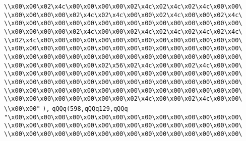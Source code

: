 \verb|\\x00\x00\x02\x4c\x00\x00\x00\x00\x02\x4c\x02\x4c\x02\x4c\x00\x00\|\newline
\verb|\\x00\x00\x00\x00\x02\x4c\x02\x4c\x00\x00\x02\x4c\x00\x00\x02\x4c\|\newline
\verb|\\x00\x00\x00\x00\x00\x00\x00\x00\x00\x00\x00\x00\x00\x00\x00\x00\|\newline
\verb|\\x00\x00\x00\x00\x02\x4c\x00\x00\x02\x4c\x02\x4c\x02\x4c\x02\x4c\|\newline
\verb|\\x02\x4c\x00\x00\x00\x00\x00\x00\x00\x00\x00\x00\x00\x00\x00\x00\|\newline
\verb|\\x00\x00\x00\x00\x00\x00\x00\x00\x00\x00\x00\x00\x00\x00\x00\x00\|\newline
\verb|\\x00\x00\x00\x00\x00\x00\x00\x00\x00\x00\x00\x00\x00\x00\x00\x00\|\newline
\verb|\\x00\x00\x00\x00\x00\x00\x02\x56\x02\x4c\x00\x00\x02\x4c\x00\x00\|\newline
\verb|\\x00\x00\x00\x00\x00\x00\x00\x00\x00\x00\x00\x00\x00\x00\x00\x00\|\newline
\verb|\\x00\x00\x00\x00\x00\x00\x00\x00\x00\x00\x00\x00\x00\x00\x00\x00\|\newline
\verb|\\x00\x00\x00\x00\x00\x00\x00\x00\x00\x00\x00\x00\x00\x00\x00\x00\|\newline
\verb|\\x00\x00\x00\x00\x00\x00\x00\x00\x02\x4c\x00\x00\x02\x4c\x00\x00\|\newline
\verb|\\x00\x00"|\newline
\verb|),|\newline
\verb|qQQq(598,qQQq129,qQQq|\newline
\verb|"\x00\x00\x00\x00\x00\x00\x00\x00\x00\x00\x00\x00\x00\x00\x00\x00\|\newline
\verb|\\x00\x00\x00\x00\x00\x00\x00\x00\x00\x00\x00\x00\x00\x00\x00\x00\|\newline
\verb|\\x00\x00\x00\x00\x00\x00\x00\x00\x00\x00\x00\x00\x00\x00\x00\x00\|\newline
